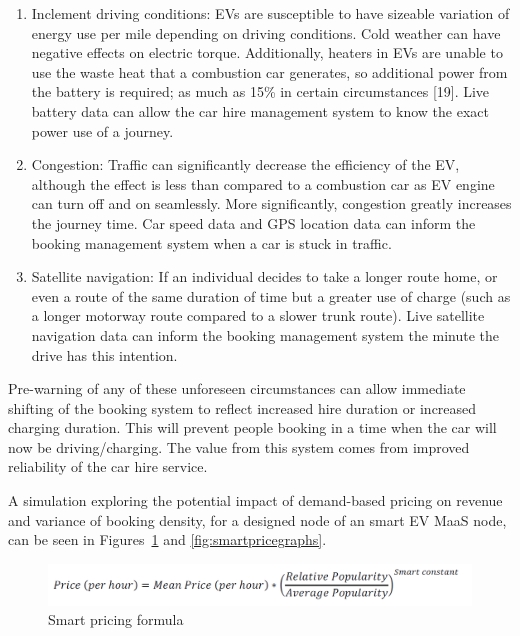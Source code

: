 \documentclass[journal]{IEEEtran}
\begin{document}
\begin{enumerate}
\item Inclement driving conditions: EVs are susceptible to have
  sizeable variation of energy use per mile depending on driving
  conditions. Cold weather can have negative effects on electric
  torque. Additionally, heaters in EVs are unable to use the waste
  heat that a combustion car generates, so additional power from the
  battery is required; as much as 15\% in certain circumstances
  [19]. Live battery data can allow the car hire management system to
  know the exact power use of a journey.
\item Congestion: Traffic can significantly decrease the efficiency of
  the EV, although the effect is less than compared to a combustion
  car as EV engine can turn off and on seamlessly. More significantly,
  congestion greatly increases the journey time. Car speed data and
  GPS location data can inform the booking management system when a
  car is stuck in traffic.
\item Satellite navigation: If an individual decides to take a longer
  route home, or even a route of the same duration of time but a
  greater use of charge (such as a longer motorway route compared to a
  slower trunk route). Live satellite navigation data can inform the
  booking management system the minute the drive has this intention.
\end{enumerate}

Pre-warning of any of these unforeseen circumstances can allow
immediate shifting of the booking system to reflect increased hire
duration or increased charging duration. This will prevent people
booking in a time when the car will now be driving/charging. The value
from this system comes from improved reliability of the car hire
service.

A simulation exploring the potential impact of demand-based pricing on
revenue and variance of booking density, for a designed node of an
smart EV MaaS node, can be seen in
Figures~\ref{fig:smartpricingformula} and \ref{fig:smartpricegraphs}.

\begin{figure}[!h]
\centering
\includegraphics[width=\columnwidth]{images/smartpricingformula.png}
\caption{Smart pricing formula}
\label{fig:smartpricingformula}
\end{figure}
\end{document}
